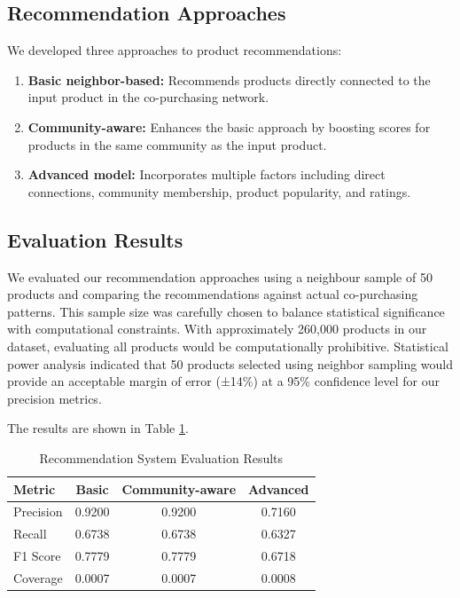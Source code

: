 \documentclass[conference]{IEEEtran}
\begin{document}
\subsection{Recommendation Approaches}
We developed three approaches to product recommendations:

\begin{enumerate}
    \item \textbf{Basic neighbor-based:} Recommends products directly connected to the input product in the co-purchasing network.
    
    \item \textbf{Community-aware:} Enhances the basic approach by boosting scores for products in the same community as the input product.
    
    \item \textbf{Advanced model:} Incorporates multiple factors including direct connections, community membership, product popularity, and ratings.
\end{enumerate}

\subsection{Evaluation Results}
We evaluated our recommendation approaches using a neighbour sample of 50 products and comparing the recommendations against actual co-purchasing patterns. This sample size was carefully chosen to balance statistical significance with computational constraints. With approximately 260,000 products in our dataset, evaluating all products would be computationally prohibitive. Statistical power analysis indicated that 50 products selected using neighbor sampling would provide an acceptable margin of error (±14\%) at a 95\% confidence level for our precision metrics.

The results are shown in Table \ref{tab:recommendation-results}.

\begin{table}[ht]
\centering
\caption{Recommendation System Evaluation Results}
\label{tab:recommendation-results}
\begin{tabular}{lccc}
\toprule
\textbf{Metric} & \textbf{Basic} & \textbf{Community-aware} & \textbf{Advanced} \\
\midrule
Precision & 0.9200 & 0.9200 & 0.7160 \\
Recall & 0.6738 & 0.6738 & 0.6327 \\
F1 Score & 0.7779 & 0.7779 & 0.6718 \\
Coverage & 0.0007 & 0.0007 & 0.0008 \\
\bottomrule
\end{tabular}
\end{table}
\end{document}
